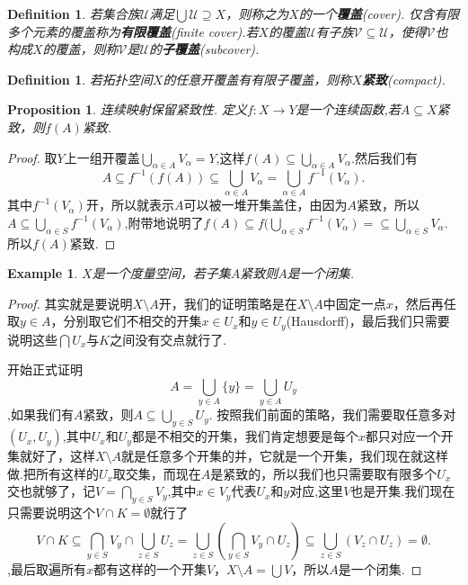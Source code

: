 \documentclass{article}
\newtheorem{proposition}[theorem]{Proposition}
\newtheorem{example}[theorem]{Example}
\newtheorem{definition}[theorem]{Definition}
\newcommand*{\xfunc}[4]{{#2}\colon{#3}{#1}{#4}}
\newcommand*{\func}[3]{\xfunc{\to}{#1}{#2}{#3}}
\begin{document}
\begin{definition}
若集合族$\mathcal{U}$满足$\bigcup\mathcal{U} \supseteq X$，则称之为$X$的一个\textbf{覆盖}(\rm cover). 仅含有限多个元素的覆盖称为\textbf{有限覆盖}(finite cover).若$X$的覆盖$\mathcal{U}$有子族$\mathcal{V} \subseteq \mathcal{U}$，使得$\mathcal{V}$也构成$X$的覆盖，则称$\mathcal{V}$是$\mathcal{U}$的\textbf{子覆盖}(subcover).
\end{definition}


\begin{definition}
若拓扑空间$X$的任意开覆盖有有限子覆盖，则称$X$\textbf{紧致}(\rm compact).
\end{definition}


\begin{proposition}
连续映射保留紧致性. 定义$\func{f}{X}{Y}$是一个连续函数,若$A \subseteq X$紧致，则$f(A)$紧致.
\end{proposition}

\begin{proof}
取$Y$上一组开覆盖$\bigcup\limits_{\alpha \in A}V_\alpha=Y$,这样$f(A) \subseteq \bigcup\limits_{\alpha \in A}V_\alpha$.然后我们有\[A \subseteq f^{-1}(f(A)) \subseteq \bigcup\limits_{\alpha \in A}V_\alpha = \bigcup\limits_{\alpha \in A} f^{-1}(V_\alpha).\]其中$f^{-1}(V_\alpha)$开，所以就表示$A$可以被一堆开集盖住，由因为$A$紧致，所以$A \subseteq \bigcup\limits_{\alpha \in S} f^{-1}(V_\alpha)$,附带地说明了$f(A) \subseteq f(\bigcup\limits_{\alpha \in S} f^{-1}(V_\alpha) = \subseteq \bigcup\limits_{\alpha \in S} V_\alpha $.所以$f(A)$紧致.
\end{proof}



\begin{example}
$X$是一个度量空间，若子集$A$紧致则$A$是一个闭集.
\end{example}

\begin{proof}
其实就是要说明$X \setminus A$开，我们的证明策略是在$X \setminus A$中固定一点$x$，然后再任取$y \in A$，分别取它们不相交的开集$x \in U_x$和$y \in U_y$(Hausdorff)，最后我们只需要说明这些$\bigcap U_x$与$K$之间没有交点就行了.

开始正式证明\[A = \bigcup\limits_{y \in A} \{y\} = \bigcup\limits_{y \in A}U_y \],如果我们有$A$紧致，则$ A \subseteq \bigcup\limits_{y \in S} U_y$. 按照我们前面的策略，我们需要取任意多对$(U_x,U_y)$,其中$U_x$和$U_y$都是不相交的开集，我们肯定想要是每个$x$都只对应一个开集就好了，这样$X \setminus A$就是任意多个开集的并，它就是一个开集，我们现在就这样做.把所有这样的$U_x$取交集，而现在$A$是紧致的，所以我们也只需要取有限多个$U_x$交也就够了，记$V = \bigcap\limits_{y \in S} V_y$,其中$x \in V_y$代表$U_x$和$y$对应,这里$V$也是开集.我们现在只需要说明这个$V \cap K = \emptyset$就行了\[V \cap K \subseteq \bigcap\limits_{y \in S} V_y \cap \bigcup\limits_{z \in S} U_z = \bigcup\limits_{z \in S}(\bigcap\limits_{y \in S} V_y \cap U_z) \subseteq \bigcup\limits_{z \in S}(V_z \cap U_z) = \emptyset. \],最后取遍所有$x$都有这样的一个开集$V$，$X \setminus A = \bigcup V$，所以$A$是一个闭集.
\end{proof}
\end{document}
